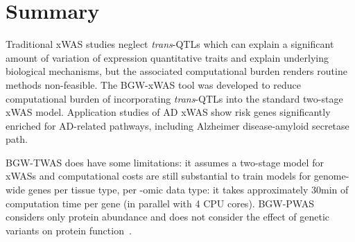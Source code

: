 \documentclass[11pt,hidelinks]{article}
\begin{document}



\section{Summary}

Traditional xWAS studies neglect \textit{trans}-QTLs which can explain a significant amount of variation of expression quantitative traits and explain underlying biological mechanisms, but the associated computational burden renders routine methods non-feasible. The BGW-xWAS tool was developed to reduce computational burden of incorporating \textit{trans}-QTLs into the standard two-stage xWAS model. Application studies of AD xWAS show risk genes significantly enriched for AD-related pathways, including Alzheimer disease-amyloid secretase path. 

BGW-TWAS does have some limitations: it assumes a two-stage model for xWASs and computational costs are still substantial to train models for genome-wide genes per tissue type, per -omic data type: it takes approximately 30min of computation time per gene (in parallel with 4 CPU cores). BGW-PWAS considers only protein abundance and does not consider the effect of genetic variants on protein function~\cite{brandesPWASProteomewideAssociation2020}.


\pagebreak

\renewcommand\bibsection{\section{\refname}}
% 

% 
% 
% 
\newpage
\pagebreak
\end{document}
